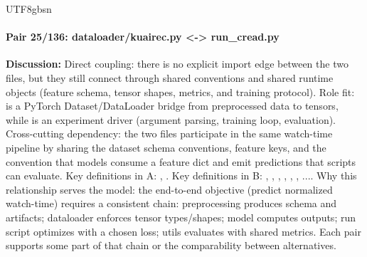 \documentclass[11pt]{article}
\begin{document}
\begin{CJK*}{UTF8}{gbsn}
\paragraph{Pair 25/136: dataloader/kuairec.py <-> run\_cread.py}
\textbf{Discussion:} Direct coupling: there is no explicit import edge between the two files, but they still connect through shared conventions and shared runtime objects (feature schema, tensor shapes, metrics, and training protocol). Role fit: \texttt{} is a PyTorch Dataset/DataLoader bridge from preprocessed data to tensors, while \texttt{} is an experiment driver (argument parsing, training loop, evaluation). Cross-cutting dependency: the two files participate in the same watch-time pipeline by sharing the dataset schema conventions, feature keys, and the convention that models consume a feature dict and emit predictions that scripts can evaluate. Key definitions in A: \texttt{}, \texttt{}. Key definitions in B: \texttt{}, \texttt{}, \texttt{}, \texttt{}, \texttt{}, \texttt{}, .... Why this relationship serves the model: the end-to-end objective (predict normalized watch-time) requires a consistent chain: preprocessing produces schema and artifacts; dataloader enforces tensor types/shapes; model computes outputs; run script optimizes with a chosen loss; utils evaluates with shared metrics. Each pair supports some part of that chain or the comparability between alternatives.


\end{CJK*}
\end{document}
